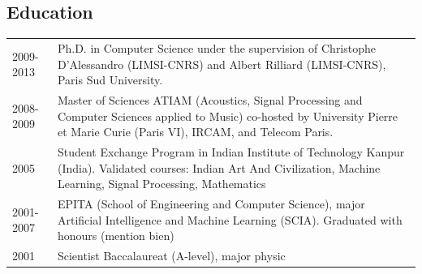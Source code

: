 



\begin{en}
\section{Education}
\begin{tabularx}{\linewidth}{@{}l X@{}}	
2009-2013 & Ph.D. in Computer Science under the supervision of Christophe D’Alessandro (LIMSI-CNRS) and Albert Rilliard (LIMSI-CNRS), Paris Sud University.\\
2008-2009 & Master of Sciences ATIAM (Acoustics, Signal Processing and Computer Sciences applied to Music) co-hosted by University Pierre et Marie Curie (Paris VI), IRCAM, and Telecom Paris.\\
2005 & Student Exchange Program in Indian Institute of Technology Kanpur (India). Validated courses: Indian Art And Civilization, Machine Learning, Signal Processing, Mathematics\\
2001-2007 & EPITA (School of Engineering and Computer Science), major Artificial Intelligence and Machine Learning (SCIA). Graduated with honours (mention bien)\\
2001 & Scientist Baccalaureat (A-level), major physic\\
\end{tabularx}
\end{en}


